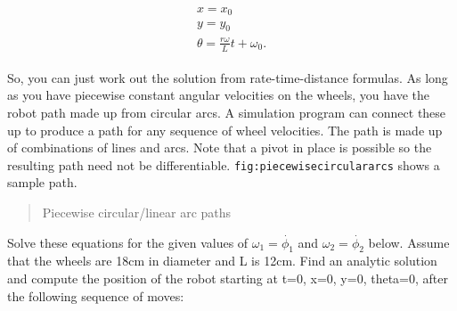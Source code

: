 \[\begin{aligned}
\begin{array}{l}
 x = x_0\\[2mm]
 y = y_0\\[2mm]
\theta = \displaystyle \frac{r\omega}{L} t + \omega_0 .
\end{array}
\end{aligned}\]

So, you can just work out the solution from rate-time-distance formulas.
As long as you have piecewise constant angular velocities on the wheels,
you have the robot path made up from circular arcs. A simulation program
can connect these up to produce a path for any sequence of wheel
velocities. The path is made up of combinations of lines and arcs. Note
that a pivot in place is possible so the resulting path need not be
differentiable. \texttt{fig:piecewisecirculararcs} shows a sample path.

\begin{quote}
Piecewise circular/linear arc paths
\end{quote}

Solve these equations for the given values of \(\omega_1=\dot{\phi_1}\)
and \(\omega_2=\dot{\phi_2}\) below. Assume that the wheels are 18cm in
diameter and L is 12cm. Find an analytic solution and compute the
position of the robot starting at t=0, x=0, y=0, theta=0, after the
following sequence of moves:

